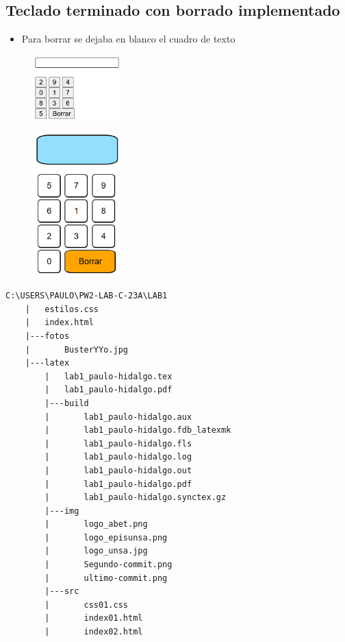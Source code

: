 \documentclass{article}
\begin{document}
\subsection{Teclado terminado con borrado implementado}
	
	\begin{itemize}	
		\item Para borrar se dejaba en blanco el cuadro de texto
	\end{itemize}
	
	
	\begin{figure}[H]
		\centering
		\includegraphics[width=0.3\textwidth,keepaspectratio]{img/calc02.png}
	\end{figure}
	\begin{figure}[H]
		\centering
		\includegraphics[width=0.3\textwidth,keepaspectratio]{img/calc03.png}
	\end{figure}
\begin{lstlisting}[style=ascii-tree]
	C:\USERS\PAULO\PW2-LAB-C-23A\LAB1
	|	estilos.css
	|	index.html
	|---fotos
	|		BusterYYo.jpg
	|---latex
		|	lab1_paulo-hidalgo.tex
		|   lab1_paulo-hidalgo.pdf
		|---build
		|		lab1_paulo-hidalgo.aux
		|       lab1_paulo-hidalgo.fdb_latexmk
		|       lab1_paulo-hidalgo.fls
		|       lab1_paulo-hidalgo.log
		|       lab1_paulo-hidalgo.out
		|       lab1_paulo-hidalgo.pdf
		|       lab1_paulo-hidalgo.synctex.gz
		|---img
		|		logo_abet.png
		|       logo_episunsa.png
		|       logo_unsa.jpg
		|       Segundo-commit.png
		|       ultimo-commit.png
		|---src
		|		css01.css
		|		index01.html
		|		index02.html
\end{lstlisting}    
\end{document}

